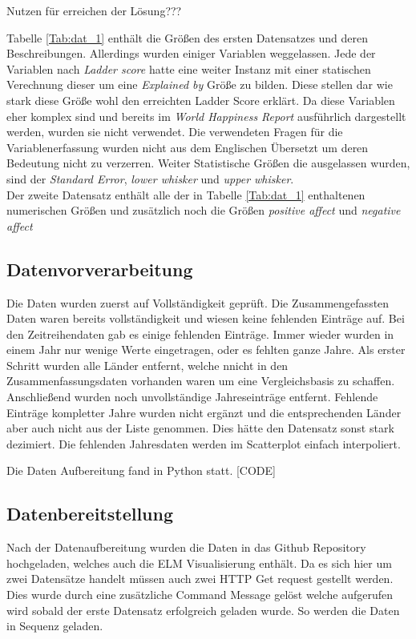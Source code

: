 Nutzen für erreichen der Lösung???

Tabelle \ref{Tab:dat_1} enthält die Größen des ersten Datensatzes und deren Beschreibungen. Allerdings wurden einiger Variablen weggelassen. Jede der Variablen nach \textit{Ladder score} hatte eine weiter Instanz mit einer statischen Verechnung dieser um eine \textit{Explained by} Größe zu bilden. Diese stellen dar wie stark diese Größe wohl den erreichten Ladder Score erklärt. Da diese Variablen eher komplex sind und bereits im \textit{World Happiness Report}  ausführlich dargestellt werden, wurden sie nicht verwendet. Die verwendeten Fragen für die Variablenerfassung wurden nicht aus dem Englischen Übersetzt um deren Bedeutung nicht zu verzerren. Weiter Statistische Größen die ausgelassen wurden, sind der \textit{Standard Error}, \textit{lower whisker} und \textit{upper whisker}. \\

Der zweite Datensatz enthält alle der in Tabelle \ref{Tab:dat_1} enthaltenen numerischen Größen und zusätzlich noch die Größen \textit{positive affect} und \textit{negative affect}




\subsection{Datenvorverarbeitung}

Die Daten wurden zuerst auf Vollständigkeit geprüft. Die Zusammengefassten Daten waren bereits vollständigkeit und wiesen keine fehlenden Einträge auf. Bei den Zeitreihendaten gab es einige fehlenden Einträge. Immer wieder wurden in einem Jahr nur wenige Werte eingetragen, oder es fehlten ganze Jahre. Als erster Schritt wurden alle Länder entfernt, welche nnicht in den Zusammenfassungsdaten vorhanden waren um eine Vergleichsbasis zu schaffen. Anschließend wurden noch unvollständige Jahreseinträge entfernt. Fehlende Einträge kompletter Jahre wurden nicht ergänzt und die entsprechenden Länder aber auch nicht aus der Liste genommen. Dies hätte den Datensatz sonst stark dezimiert. Die fehlenden Jahresdaten werden im Scatterplot einfach interpoliert. 

Die Daten Aufbereitung fand in Python statt. 
[CODE]

\subsection{Datenbereitstellung}

Nach der Datenaufbereitung wurden die Daten in das Github Repository hochgeladen, welches auch die ELM Visualisierung enthält. Da es sich hier um zwei Datensätze handelt müssen auch zwei HTTP Get request gestellt werden. Dies wurde durch eine zusätzliche Command Message gelöst welche aufgerufen wird sobald der erste Datensatz erfolgreich geladen wurde. So werden die Daten in Sequenz geladen. 